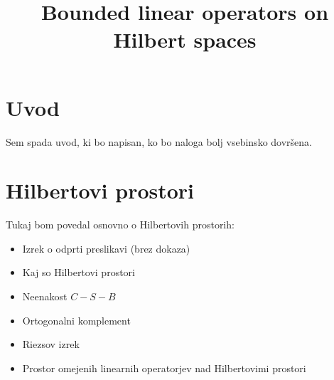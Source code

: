 \documentclass[mat2]{matdelo}
\title{Bounded linear operators on Hilbert spaces}
\begin{document}
	
	\tableofcontents
	
	\section{Uvod}\label{sect:intro}
	Sem spada uvod, ki bo napisan, ko bo naloga bolj vsebinsko dovršena.
	
	\section{Hilbertovi prostori}
		Tukaj bom povedal osnovno o Hilbertovih prostorih: \begin{itemize}
			\item Izrek o odprti preslikavi (brez dokaza)
			\item Kaj so Hilbertovi prostori
			\item Neenakost $C-S-B$
			\item Ortogonalni komplement
			\item Riezsov izrek
			\item Prostor omejenih linearnih operatorjev nad Hilbertovimi prostori
		\end{itemize}
		
\end{document}
